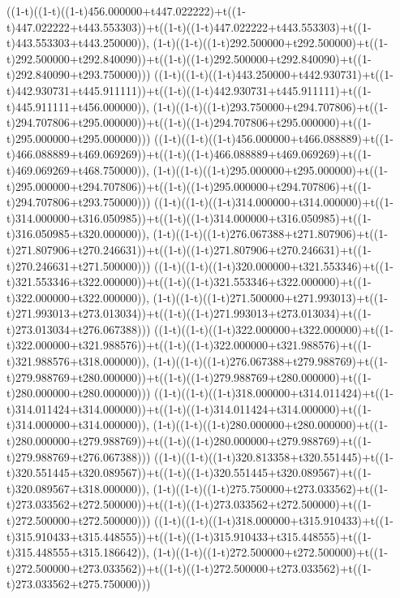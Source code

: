 ((1-t)((1-t)((1-t)456.000000+t447.022222)+t((1-t)447.022222+t443.553303))+t((1-t)((1-t)447.022222+t443.553303)+t((1-t)443.553303+t443.250000)),                                     (1-t)((1-t)((1-t)292.500000+t292.500000)+t((1-t)292.500000+t292.840090))+t((1-t)((1-t)292.500000+t292.840090)+t((1-t)292.840090+t293.750000)))
((1-t)((1-t)((1-t)443.250000+t442.930731)+t((1-t)442.930731+t445.911111))+t((1-t)((1-t)442.930731+t445.911111)+t((1-t)445.911111+t456.000000)),                                     (1-t)((1-t)((1-t)293.750000+t294.707806)+t((1-t)294.707806+t295.000000))+t((1-t)((1-t)294.707806+t295.000000)+t((1-t)295.000000+t295.000000)))
((1-t)((1-t)((1-t)456.000000+t466.088889)+t((1-t)466.088889+t469.069269))+t((1-t)((1-t)466.088889+t469.069269)+t((1-t)469.069269+t468.750000)),                                     (1-t)((1-t)((1-t)295.000000+t295.000000)+t((1-t)295.000000+t294.707806))+t((1-t)((1-t)295.000000+t294.707806)+t((1-t)294.707806+t293.750000)))
((1-t)((1-t)((1-t)314.000000+t314.000000)+t((1-t)314.000000+t316.050985))+t((1-t)((1-t)314.000000+t316.050985)+t((1-t)316.050985+t320.000000)),                                     (1-t)((1-t)((1-t)276.067388+t271.807906)+t((1-t)271.807906+t270.246631))+t((1-t)((1-t)271.807906+t270.246631)+t((1-t)270.246631+t271.500000)))
((1-t)((1-t)((1-t)320.000000+t321.553346)+t((1-t)321.553346+t322.000000))+t((1-t)((1-t)321.553346+t322.000000)+t((1-t)322.000000+t322.000000)),                                     (1-t)((1-t)((1-t)271.500000+t271.993013)+t((1-t)271.993013+t273.013034))+t((1-t)((1-t)271.993013+t273.013034)+t((1-t)273.013034+t276.067388)))
((1-t)((1-t)((1-t)322.000000+t322.000000)+t((1-t)322.000000+t321.988576))+t((1-t)((1-t)322.000000+t321.988576)+t((1-t)321.988576+t318.000000)),                                     (1-t)((1-t)((1-t)276.067388+t279.988769)+t((1-t)279.988769+t280.000000))+t((1-t)((1-t)279.988769+t280.000000)+t((1-t)280.000000+t280.000000)))
((1-t)((1-t)((1-t)318.000000+t314.011424)+t((1-t)314.011424+t314.000000))+t((1-t)((1-t)314.011424+t314.000000)+t((1-t)314.000000+t314.000000)),                                     (1-t)((1-t)((1-t)280.000000+t280.000000)+t((1-t)280.000000+t279.988769))+t((1-t)((1-t)280.000000+t279.988769)+t((1-t)279.988769+t276.067388)))
((1-t)((1-t)((1-t)320.813358+t320.551445)+t((1-t)320.551445+t320.089567))+t((1-t)((1-t)320.551445+t320.089567)+t((1-t)320.089567+t318.000000)),                                     (1-t)((1-t)((1-t)275.750000+t273.033562)+t((1-t)273.033562+t272.500000))+t((1-t)((1-t)273.033562+t272.500000)+t((1-t)272.500000+t272.500000)))
((1-t)((1-t)((1-t)318.000000+t315.910433)+t((1-t)315.910433+t315.448555))+t((1-t)((1-t)315.910433+t315.448555)+t((1-t)315.448555+t315.186642)),                                     (1-t)((1-t)((1-t)272.500000+t272.500000)+t((1-t)272.500000+t273.033562))+t((1-t)((1-t)272.500000+t273.033562)+t((1-t)273.033562+t275.750000)))
